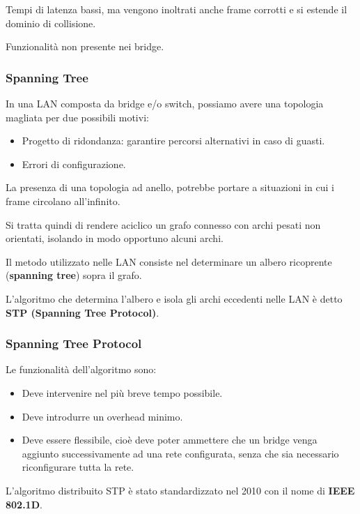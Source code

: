             Tempi di latenza bassi, ma vengono inoltrati anche frame corrotti e si estende il dominio di collisione.
    
            Funzionalità non presente nei bridge.

        \subsubsection{Spanning Tree}
            In una LAN composta da bridge e/o switch, possiamo avere una topologia magliata per due possibili motivi:
            \begin{itemize}
                \item Progetto di ridondanza: garantire percorsi alternativi in caso di guasti.
                \item Errori di configurazione.
            \end{itemize}

            La presenza di una topologia ad anello, potrebbe portare a situazioni in cui i frame circolano all'infinito.

            Si tratta quindi di rendere aciclico un grafo connesso con archi pesati non orientati, isolando in modo opportuno alcuni archi.

            Il metodo utilizzato nelle LAN consiste nel determinare un albero ricoprente (\textbf{spanning tree}) sopra il grafo.

            L'algoritmo che determina l'albero e isola gli archi eccedenti nelle LAN è detto \textbf{STP (Spanning Tree Protocol)}.

        \subsubsection{Spanning Tree Protocol}
            Le funzionalità dell'algoritmo sono:
            \begin{itemize}
                \item Deve intervenire nel più breve tempo possibile.
                \item Deve introdurre un overhead minimo.
                \item Deve essere flessibile, cioè deve poter ammettere che un bridge venga aggiunto successivamente ad una rete configurata, senza che sia necessario riconfigurare tutta la rete.
            \end{itemize}

            L'algoritmo distribuito STP è stato standardizzato nel 2010 con il nome di \textbf{IEEE 802.1D}.

